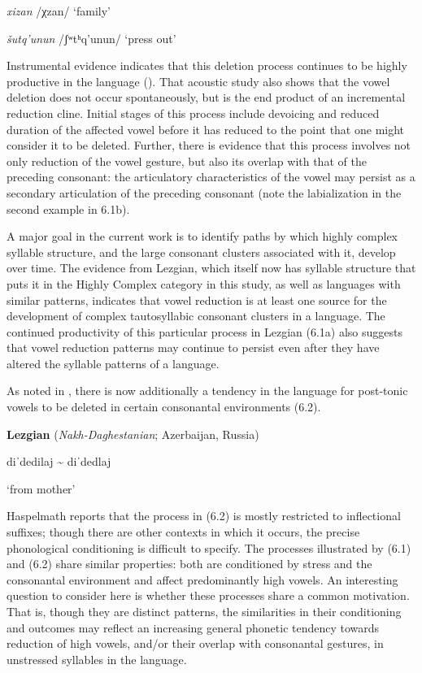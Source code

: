 \textit{xizan}      /χzan/      ‘family’

\textit{šutq’unun}    /ʃʷtʰq’unun/    ‘press out’

\citep[36-8]{Haspelmath1993}
\z

  Instrumental evidence indicates that this deletion process continues to be highly productive in the language (\citealt{ChitoranBabaliyeva2007}). That acoustic study also shows that the vowel deletion does not occur spontaneously, but is the end product of an incremental reduction cline. Initial stages of this process include devoicing and reduced duration of the affected vowel before it has reduced to the point that one might consider it to be deleted. Further, there is evidence that this process involves not only reduction of the vowel gesture, but also its overlap with that of the preceding consonant: the articulatory characteristics of the vowel may persist as a secondary articulation of the preceding consonant (note the labialization in the second example in 6.1b).

  A major goal in the current work is to identify paths by which highly complex syllable structure, and the large consonant clusters associated with it, develop over time. The evidence from Lezgian, which itself now has syllable structure that puts it in the Highly Complex category in this study, as well as languages with similar patterns, indicates that vowel reduction is at least one source for the development of complex tautosyllabic consonant clusters in a language. The continued productivity of this particular process in Lezgian (6.1a) also suggests that vowel reduction patterns may continue to persist even after they have altered the syllable patterns of a language. 

  As noted in , there is now additionally a tendency in the language for post-tonic vowels to be deleted in certain consonantal environments (6.2).

\ea\label{ex:(6.2)}
  \textbf{Lezgian} (\textit{Nakh-Daghestanian}; Azerbaijan, Russia)

diˈdedilaj {\textasciitilde} diˈdedlaj

‘from mother’

\citep[40]{Haspelmath1993}

\z

Haspelmath reports that the process in (6.2) is mostly restricted to inflectional suffixes; though there are other contexts in which it occurs, the precise phonological conditioning is difficult to specify. The processes illustrated by (6.1) and (6.2) share similar properties: both are conditioned by stress and the consonantal environment and affect predominantly high vowels. An interesting question to consider here is whether these processes share a common motivation. That is, though they are distinct patterns, the similarities in their conditioning and outcomes may reflect an increasing general phonetic tendency towards reduction of high vowels, and/or their overlap with consonantal gestures, in unstressed syllables in the language.

